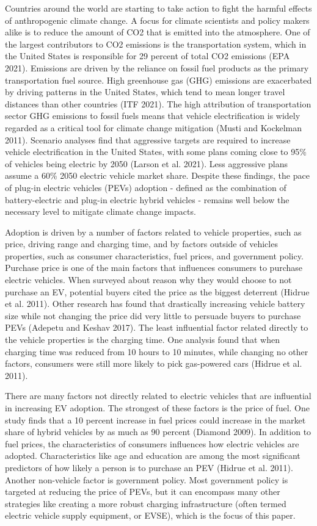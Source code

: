 \documentclass[
  letterpaper,
  DIV=11,
  numbers=noendperiod]{scrartcl}
\begin{document}
Countries around the world are starting to take action to fight the
harmful effects of anthropogenic climate change. A focus for climate
scientists and policy makers alike is to reduce the amount of CO2 that
is emitted into the atmosphere. One of the largest contributors to CO2
emissions is the transportation system, which in the United States is
responsible for 29 percent of total CO2 emissions (EPA 2021). Emissions
are driven by the reliance on fossil fuel products as the primary
transportation fuel source. High greenhouse gas (GHG) emissions are
exacerbated by driving patterns in the United States, which tend to mean
longer travel distances than other countries (ITF 2021). The high
attribution of transportation sector GHG emissions to fossil fuels means
that vehicle electrification is widely regarded as a critical tool for
climate change mitigation (Musti and Kockelman 2011). Scenario analyses
find that aggressive targets are required to increase vehicle
electrification in the United States, with some plans coming close to
95\% of vehicles being electric by 2050 (Larson et al. 2021). Less
aggressive plans assume a 60\% 2050 electric vehicle market share.
Despite these findings, the pace of plug-in electric vehicles (PEVs)
adoption - defined as the combination of battery-electric and plug-in
electric hybrid vehicles - remains well below the necessary level to
mitigate climate change impacts.

Adoption is driven by a number of factors related to vehicle properties,
such as price, driving range and charging time, and by factors outside
of vehicles properties, such as consumer characteristics, fuel prices,
and government policy. Purchase price is one of the main factors that
influences consumers to purchase electric vehicles. When surveyed about
reason why they would choose to not purchase an EV, potential buyers
cited the price as the biggest deterrent (Hidrue et al. 2011). Other
research has found that drastically increasing vehicle battery size
while not changing the price did very little to persuade buyers to
purchase PEVs (Adepetu and Keshav 2017). The least influential factor
related directly to the vehicle properties is the charging time. One
analysis found that when charging time was reduced from 10 hours to 10
minutes, while changing no other factors, consumers were still more
likely to pick gas-powered cars (Hidrue et al. 2011).

There are many factors not directly related to electric vehicles that
are influential in increasing EV adoption. The strongest of these
factors is the price of fuel. One study finds that a 10 percent increase
in fuel prices could increase in the market share of hybrid vehicles by
as much as 90 percent (Diamond 2009). In addition to fuel prices, the
characteristics of consumers influences how electric vehicles are
adopted. Characteristics like age and education are among the most
significant predictors of how likely a person is to purchase an PEV
(Hidrue et al. 2011). Another non-vehicle factor is government policy.
Most government policy is targeted at reducing the price of PEVs, but it
can encompass many other strategies like creating a more robust charging
infrastructure (often termed electric vehicle supply equipment, or
EVSE), which is the focus of this paper.
\end{document}
